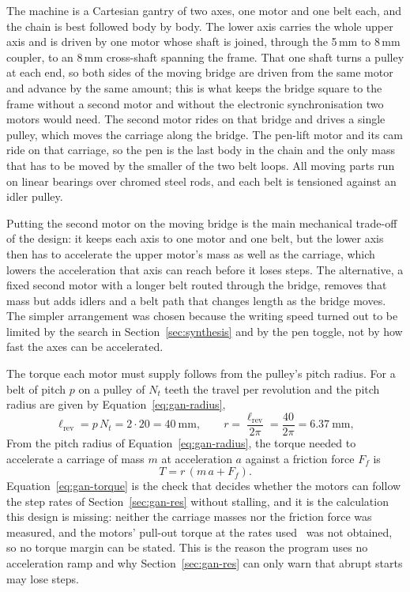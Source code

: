 The machine is a Cartesian gantry of two axes, one motor and one belt each, and the chain is best followed body by body.
The lower axis carries the whole upper axis and is driven by one motor whose shaft is joined, through the 5\,mm to 8\,mm coupler, to an 8\,mm cross-shaft spanning the frame.
That one shaft turns a pulley at each end, so both sides of the moving bridge are driven from the same motor and advance by the same amount; this is what keeps the bridge square to the frame without a second motor and without the electronic synchronisation two motors would need.
The second motor rides on that bridge and drives a single pulley, which moves the carriage along the bridge.
The pen-lift motor and its cam ride on that carriage, so the pen is the last body in the chain and the only mass that has to be moved by the smaller of the two belt loops.
All moving parts run on linear bearings over chromed steel rods, and each belt is tensioned against an idler pulley.

Putting the second motor on the moving bridge is the main mechanical trade-off of the design: it keeps each axis to one motor and one belt, but the lower axis then has to accelerate the upper motor's mass as well as the carriage, which lowers the acceleration that axis can reach before it loses steps.
The alternative, a fixed second motor with a longer belt routed through the bridge, removes that mass but adds idlers and a belt path that changes length as the bridge moves.
The simpler arrangement was chosen because the writing speed turned out to be limited by the search in Section~\ref{sec:synthesis} and by the pen toggle, not by how fast the axes can be accelerated.

The torque each motor must supply follows from the pulley's pitch radius.
For a belt of pitch $p$ on a pulley of $N_t$ teeth the travel per revolution and the pitch radius are given by Equation~\ref{eq:gan-radius},
\begin{equation}
\ell_{\mathrm{rev}}=p\,N_t=2\cdot20=40\ \mathrm{mm},\qquad r=\frac{\ell_{\mathrm{rev}}}{2\pi}=\frac{40}{2\pi}=6.37\ \mathrm{mm},
\label{eq:gan-radius}
\end{equation}
From the pitch radius of Equation~\ref{eq:gan-radius}, the torque needed to accelerate a carriage of mass $m$ at acceleration $a$ against a friction force $F_f$ is
\begin{equation}
T=r\,(m\,a+F_f).
\label{eq:gan-torque}
\end{equation}
Equation~\ref{eq:gan-torque} is the check that decides whether the motors can follow the step rates of Section~\ref{sec:gan-res} without stalling, and it is the calculation this design is missing: neither the carriage masses nor the friction force was measured, and the motors' pull-out torque at the rates used~\cite{acarnley2002,stepperds} was not obtained, so no torque margin can be stated.
This is the reason the program uses no acceleration ramp and why Section~\ref{sec:gan-res} can only warn that abrupt starts may lose steps.

